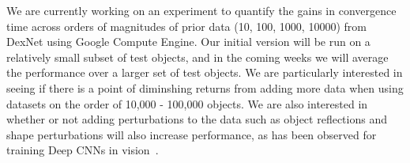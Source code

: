 We are currently working on an experiment to quantify the gains in convergence time across orders of magnitudes of prior data (10, 100, 1000, 10000) from DexNet using Google Compute Engine.
Our initial version will be run on a relatively small subset of test objects, and in the coming weeks we will average the performance over a larger set of test objects.
We are particularly interested in seeing if there is a point of diminshing returns from adding more data when using datasets on the order of 10,000 - 100,000 objects.
We are also interested in whether or not adding perturbations to the data such as object reflections and shape perturbations will also increase performance, as has been observed for training Deep CNNs in vision~\cite{krizhevsky2012imagenet}.










